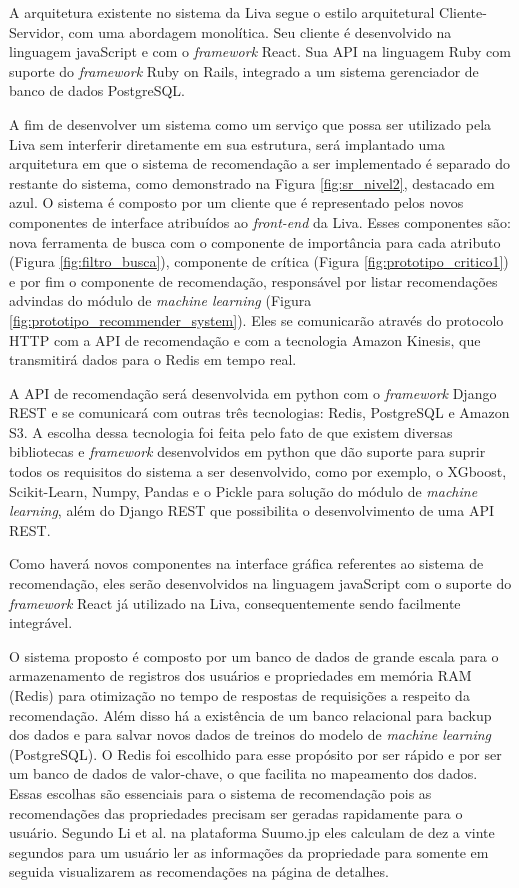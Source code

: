 A arquitetura existente no sistema da Liva segue o estilo arquitetural Cliente-Servidor, com uma abordagem monolítica. Seu cliente é desenvolvido na linguagem javaScript e com o \textit{framework} React. Sua API na linguagem Ruby com suporte do \textit{framework} Ruby on Rails, integrado a um sistema gerenciador de banco de dados PostgreSQL.

A fim de desenvolver um sistema como um serviço que possa ser utilizado pela Liva sem interferir diretamente em sua estrutura, será implantado uma arquitetura em que o sistema de recomendação a ser implementado é separado do restante do sistema, como demonstrado na Figura \ref{fig:sr_nivel2}, destacado em azul. O sistema é composto por um cliente que é representado pelos novos componentes de interface atribuídos ao \textit{front-end} da Liva. Esses componentes são: nova ferramenta de busca com o componente de importância para cada atributo (Figura \ref{fig:filtro_busca}), componente de crítica (Figura \ref{fig:prototipo_critico1}) e por fim o componente de recomendação, responsável por listar recomendações advindas do módulo de \textit{machine learning} (Figura \ref{fig:prototipo_recommender_system}). Eles se comunicarão através do protocolo HTTP com a API de recomendação e com a tecnologia Amazon Kinesis, que transmitirá dados para o Redis em tempo real.

A API de recomendação será desenvolvida em python com o \textit{framework} Django REST e se comunicará com outras três tecnologias: Redis, PostgreSQL e Amazon S3. A escolha dessa tecnologia foi feita pelo fato de que existem diversas bibliotecas e \textit{framework} desenvolvidos em python que dão suporte para suprir todos os requisitos do sistema a ser desenvolvido, como por exemplo, o XGboost, Scikit-Learn, Numpy, Pandas e o Pickle para solução do módulo de \textit{machine learning}, além do Django REST que possibilita o desenvolvimento de uma API REST.

Como haverá novos componentes na interface gráfica referentes ao sistema de recomendação, eles serão desenvolvidos na linguagem javaScript com o suporte do \textit{framework} React já utilizado na Liva, consequentemente sendo facilmente integrável.

O sistema proposto é composto por um banco de dados de grande escala para o armazenamento de registros dos usuários e propriedades em memória RAM (Redis) para otimização no tempo de respostas de requisições a respeito da recomendação. Além disso há a existência de um banco relacional para backup dos dados e para salvar novos dados de treinos do modelo de \textit{machine learning} (PostgreSQL). O Redis foi escolhido para esse propósito por ser rápido e por ser um banco de dados de valor-chave, o que facilita no mapeamento dos dados. Essas escolhas são essenciais para o sistema de recomendação pois as recomendações das propriedades precisam ser geradas rapidamente para o usuário. Segundo Li et al. \cite{Summo:2017} na plataforma Suumo.jp eles calculam de dez a vinte segundos para um usuário ler as informações da propriedade para somente em seguida visualizarem as recomendações na página de detalhes. 

